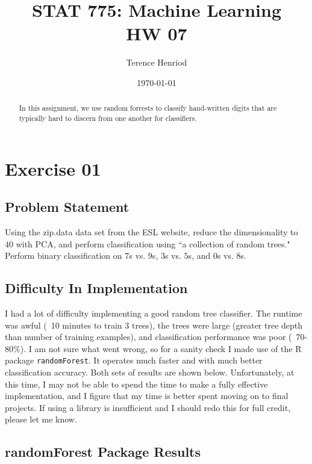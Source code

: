 \documentclass{article}
\title{STAT 775: Machine Learning \\ HW 07}
\author{Terence Henriod}
\date{\today}
\begin{document}
\clearpage            %
\maketitle            %
\thispagestyle{empty} %

\begin{abstract}
In this assignment, we use random forrests to classify hand-written digits that are typically hard to discern from one another for classifiers.
\end{abstract}

\newpage
\section{Exercise 01}
\subsection{Problem Statement}
Using the zip.data data set from the ESL website, reduce the dimensionality to $40$ with PCA, and perform classification using ``a collection of random trees." Perform binary classification on $7$s vs. $9$s, $3$s vs. $5$s, and $0$s vs. $8$s.

\subsection{Difficulty In Implementation}
I had a lot of difficulty implementing a good random tree classifier. The runtime was awful (~10 minutes to train $3$ trees), the trees were large (greater tree depth than number of training examples), and classification performance was poor (~70-80\%). I am not sure what went wrong, so for a sanity check I made use of the R package \texttt{randomForest}. It operates much faster and with much better classification accuracy. Both sets of results are shown below. Unfortunately, at this time, I may not be able to spend the time to make a fully effective implementation, and I figure that my time is better spent moving on to final projects. If using a library is insufficient and I should redo this for full credit, please let me know.
%
%
%
\subsection{randomForest Package Results}
%
\end{document}

